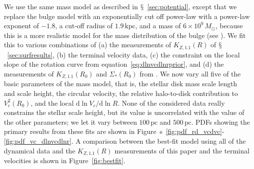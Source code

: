 \documentclass{emulateapj}
\newcommand{\dd}{\mathrm{d}}
\newcommand{\eqnname}{equation}
\newcommand{\equationname}{\eqnname}
\renewcommand{\figurename}{Figure}
\newcommand{\figurenames}{\figurename~s}
\newcommand{\sectionname}{$\mathsection$}
\newcommand{\kpc}{\ensuremath{\,\mathrm{kpc}}}
\newcommand{\pc}{\ensuremath{\,\mathrm{pc}}}
\newcommand{\kzoneone}{\ensuremath{K_{Z,1.1}}}
\begin{document}
We use the same mass model as described in
\sectionname~\ref{sec:potential}, except that we replace the bulge
model with an exponentially cut off power-law with a power-law
exponent of $-1.8$, a cut-off radius of $1.9\kpc$, and a mass of
$6\times10^{9}\,M_\odot$, because this is a more realistic model for
the mass distribution of the bulge (see
\citealt{binneytremaine,McMillan11a}). We fit this to various
combinations of (a) the measurements of $\kzoneone(R)$ of
\sectionname~\ref{sec:surfresults}, (b) the terminal velocity data,
(c) the constraint on the local slope of the rotation curve from
\equationname~\ref{eq:dlnvcdlnrprior}, and (d) the measurements of
$\kzoneone(R_0)$ and $\Sigma_*(R_0)$ from \citet{Zhang13a}. We now
vary all five of the basic parameters of the mass model, that is, the
stellar disk mass scale length and scale height, the circular
velocity, the relative halo-to-disk contribution to $V_c^2(R_0)$, and
the local $\dd \ln V_c / \dd \ln R$. None of the considered data
really constrains the stellar scale height, but its value is
uncorrelated with the value of the other parameters; we let it vary
between $100\pc$ and $500\pc$. PDFs showing the primary results from
these fits are shown in
\figurenames~\ref{fig:pdf_rd_vcdvc}-\ref{fig:pdf_vc_dlnvcdlnr}. A
comparison between the best-fit model using all of the dynamical data
and the $\kzoneone(R)$ measurements of this paper and the terminal
velocities is shown in \figurename~\ref{fig:bestfit}.
\end{document}
